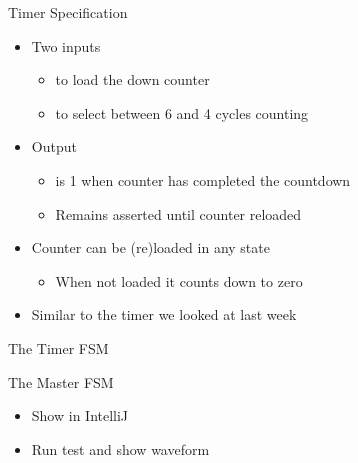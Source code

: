 \begin{frame}[fragile]{Timer Specification}
\begin{itemize}
\item Two inputs
\begin{itemize}
\item {} to load the down counter
\item {} to select between 6 and 4 cycles counting
\end{itemize}
\item Output
\begin{itemize}
\item {} is 1 when counter has completed the countdown
\item Remains asserted until counter reloaded
\end{itemize}
\item Counter can be (re)loaded in any state
\begin{itemize}
\item When not loaded it counts down to zero
\end{itemize}
\item Similar to the timer we looked at last week
\end{itemize}
\end{frame}

\begin{frame}[fragile]{The Timer FSM}
\end{frame}

\begin{frame}[fragile]{The Master FSM}
\begin{itemize}
\item Show in IntelliJ
\item Run test and show waveform
\end{itemize}
\end{frame}


%

